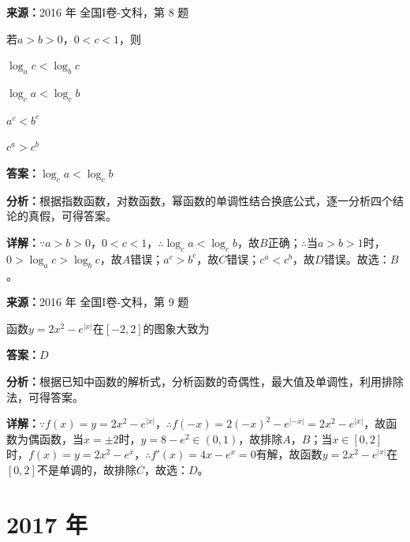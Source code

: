\begin{question}[points=5]
\textbf{来源：}2016 年 全国I卷-文科，第 8 题\par
若$a>b>0$，$0<c<1$，则
\begin{choices}
  \item $\log_ac<\log_bc$
  \item $\log_ca<\log_cb$
  \item $a^c<b^c$
  \item $c^a>c^b$
\end{choices}
\begin{solution}
\textbf{答案：}$\log_ca<\log_cb$

\textbf{分析：}根据指数函数，对数函数，幂函数的单调性结合换底公式，逐一分析四个结论的真假，可得答案。

\textbf{详解：}$\because a>b>0$，$0<c<1$，$\therefore \log_ca<\log_cb$，故$B$正确；$\therefore$当$a>b>1$时，$0>\log_ac>\log_bc$，故$A$错误；$a^c>b^c$，故$C$错误；$c^a<c^b$，故$D$错误。故选：$B$。
\end{solution}
\end{question}

\begin{question}[points=5]
\textbf{来源：}2016 年 全国I卷-文科，第 9 题\par
函数$y=2x^2-e^{|x|}$在$[-2,2]$的图象大致为
\begin{choices}
\end{choices}
\begin{solution}
\textbf{答案：}$D$

\textbf{分析：}根据已知中函数的解析式，分析函数的奇偶性，最大值及单调性，利用排除法，可得答案。

\textbf{详解：}$\because f(x)=y=2x^2-e^{|x|}$，$\therefore f(-x)=2(-x)^2-e^{|-x|}=2x^2-e^{|x|}$，故函数为偶函数，当$x=\pm2$时，$y=8-e^2\in(0,1)$，故排除$A$，$B$；当$x\in[0,2]$时，$f(x)=y=2x^2-e^x$，$\therefore f'(x)=4x-e^x=0$有解，故函数$y=2x^2-e^{|x|}$在$[0,2]$不是单调的，故排除$C$，故选：$D$。
\end{solution}
\end{question}

\section*{2017 年}

